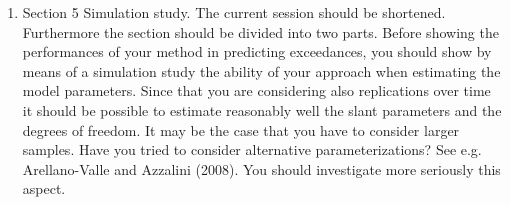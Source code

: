 \documentclass[11pt]{article}
\begin{document}
\begin{enumerate}[1.]
  \item Section 5 Simulation study. The current session should be shortened. Furthermore the section should be divided into two parts. Before showing the performances of your method in predicting exceedances, you should show by means of a simulation study the ability of your approach when estimating the model parameters. Since that you are considering also replications over time it should be possible to estimate reasonably well the slant parameters and the degrees of freedom. It may be the case that you have to consider larger samples. Have you tried to consider alternative parameterizations? See e.g. Arellano-Valle and Azzalini (2008). You should investigate more seriously this aspect.

\end{enumerate}
\end{document}
